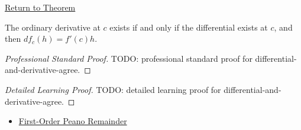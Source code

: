 \newpage
{}
\label{prf:differential-and-derivative-agree}

\begin{remark*}[Return]
\hyperref[thm:differential-and-derivative-agree]{Return to Theorem}
\end{remark*}

\begin{theorem*}
The ordinary derivative at $c$ exists if and only if the differential exists at $c$, and then $df_c(h)=f'(c)h$.
\end{theorem*}

\begin{proof}[Professional Standard Proof]
\LRAProofBodyStart
TODO: professional standard proof for differential-and-derivative-agree.
\end{proof}

\begin{proof}[Detailed Learning Proof]
\LRAProofBodyStart
TODO: detailed learning proof for differential-and-derivative-agree.
\end{proof}

\begin{remark*}
\end{remark*}

\begin{dependencies}
\begin{itemize}
  \item \hyperref[cor:first-order-peano-remainder]{First-Order Peano Remainder}
\end{itemize}
\end{dependencies}

\clearpage
